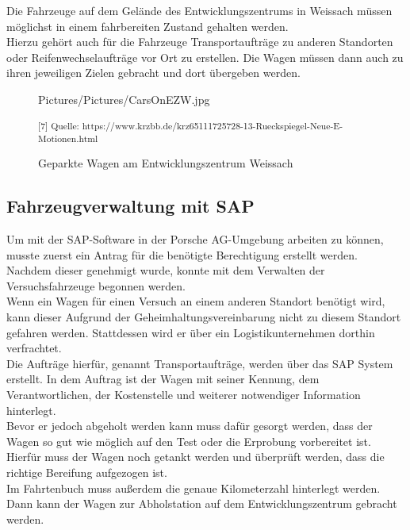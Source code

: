 Die Fahrzeuge auf dem Gelände des Entwicklungszentrums in Weissach müssen möglichst in einem fahrbereiten Zustand gehalten werden. \\
Hierzu gehört auch für die Fahrzeuge Transportaufträge zu anderen Standorten oder Reifenwechselaufträge vor Ort zu erstellen. Die Wagen müssen dann auch zu ihren jeweiligen Zielen gebracht und dort übergeben werden.

\begin{figure}[H]
	\begin{center}
		\begin{overpic}[width=\linewidth]{Pictures/Pictures/CarsOnEZW.jpg}
			
		\end{overpic}
		
		\caption{Geparkte Wagen am Entwicklungszentrum Weissach}
		
		\small\textsuperscript{[7] Quelle: https://www.krzbb.de/krz65111725728-13-Rueckspiegel-Neue-E-Motionen.html}
		\label{INCA}
	\end{center}
\end{figure}

\subsection{Fahrzeugverwaltung mit SAP}

Um mit der SAP-Software in der Porsche AG-Umgebung arbeiten zu können, musste zuerst ein Antrag für die benötigte Berechtigung erstellt werden. \\
Nachdem dieser genehmigt wurde, konnte mit dem Verwalten der Versuchsfahrzeuge begonnen werden. \\

Wenn ein Wagen für einen Versuch an einem anderen Standort benötigt wird, kann dieser Aufgrund der Geheimhaltungsvereinbarung nicht zu diesem Standort gefahren werden. Stattdessen wird er über ein Logistikunternehmen dorthin verfrachtet. \\
Die Aufträge hierfür, genannt Transportaufträge, werden über das SAP System erstellt. In dem Auftrag ist der Wagen mit seiner Kennung, dem Verantwortlichen, der Kostenstelle und weiterer notwendiger Information hinterlegt. \\
Bevor er jedoch abgeholt werden kann muss dafür gesorgt werden, dass der Wagen so gut wie möglich auf den Test oder die Erprobung vorbereitet ist. Hierfür muss der Wagen noch getankt werden und überprüft werden, dass die richtige Bereifung aufgezogen ist. \\
Im Fahrtenbuch muss außerdem die genaue Kilometerzahl hinterlegt werden. \\
Dann kann der Wagen zur Abholstation auf dem Entwicklungszentrum gebracht werden. \\

